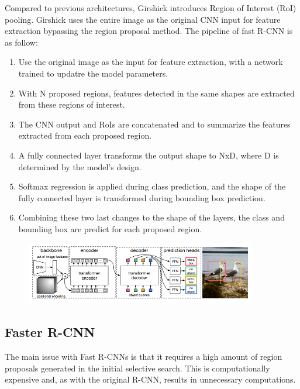 \documentclass[12pt,a4paper,twocolumn,twoside]{article}
\begin{document}
Compared to previous architectures, Girshick introduces Region of Interest (RoI) pooling. Girshick uses the entire image as the original CNN input for feature extraction bypassing the region proposal method. The pipeline of fast R-CNN is as follow:

\begin{enumerate}
    \item Use the original image as the input for feature extraction, with a network trained to updatre the model parameters.
    \item With N proposed regions, features detected in the same shapes are extracted from these regions of interest. 
    \item The CNN output and RoIs are concatenated and to summarize the features extracted from each proposed region.
    \item A fully connected layer transforms the output shape to NxD, where D is determined by the model's design.
    \item Softmax regression is applied during class prediction, and the shape of the fully connected layer is transformed during bounding box prediction.
    \item Combining these two last changes to the shape of the layers, the class and bounding box are predict for each proposed region.
\end{enumerate}

\begin{figure}[h!]    
    \centering
        \includegraphics[width=0.9\textwidth]{Resources/Images/detr.png}
    \label{fig:detr}
\end{figure}

\subsection{Faster R-CNN}
The main issue with Fast R-CNNs is that it requires a high amount of region proposals generated in the initial selective search. This is computationally expensive and, as with the original R-CNN, results in unnecessary computations. 
\end{document}
